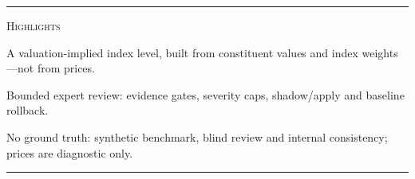 \documentclass[10pt]{article}
\begin{document}
\begin{minipage}[t]{793mm}
\vspace{5mm}
{\color{gold}\rule{\linewidth}{0.4pt}}\par
\vspace{2.8mm}

\begin{tcolorbox}[enhanced, colback=gold!6!parchment, colframe=gold!65!parchment,
  boxrule=0.4pt, arc=0mm, left=5mm, right=5mm, top=2.4mm, bottom=2.4mm, before skip=0mm, after skip=0mm]
\noindent
\begin{minipage}[c]{60mm}
  {\fontsize{18}{21}\selectfont\color{burgundy}\scshape{}Highlights}
\end{minipage}%
\hfill
\begin{minipage}[t]{221mm}\RaggedRight{}
  {\fontsize{20}{24}\selectfont\color{ink}%
  A valuation-implied index level, built from constituent values and index
  weights---not from prices.}
\end{minipage}%
\hfill
\begin{minipage}[t]{221mm}\RaggedRight{}
  {\fontsize{20}{24}\selectfont\color{ink}%
  Bounded expert review: evidence gates, severity caps, shadow/apply and
  baseline rollback.}
\end{minipage}%
\hfill
\begin{minipage}[t]{221mm}\RaggedRight{}
  {\fontsize{20}{24}\selectfont\color{ink}%
  No ground truth: synthetic benchmark, blind review and internal consistency;
  prices are diagnostic only.}
\end{minipage}
\end{tcolorbox}

\vspace{1.6mm}
{\color{gold}\rule{\linewidth}{1.1pt}}\par
\end{minipage}
\par\vspace{7mm}
\end{document}
